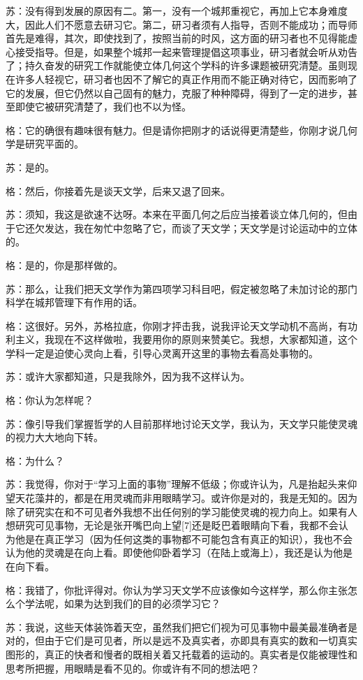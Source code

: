 \documentclass[12pt,oneside]{book}
\begin{document}
苏：没有得到发展的原因有二。第一，没有一个城邦重视它，再加上它本身难度大，因此人们不愿意去研习它。第二，研习者须有人指导，否则不能成功；而导师首先是难得，其次，即使找到了，按照当前的时风，这方面的研习者也不见得能虚心接受指导。但是，如果整个城邦一起来管理提倡这项事业，研习者就会听从劝告了；持久奋发的研究工作就能使立体几何这个学科的许多课题被研究清楚。虽则现在许多人轻视它，研习者也因不了解它的真正作用而不能正确对待它，因而影响了它的发展，但它仍然以自己固有的魅力，克服了种种障碍，得到了一定的进步，甚至即使它被研究清楚了，我们也不以为怪。

格：它的确很有趣味很有魅力。但是请你把刚才的话说得更清楚些，你刚才说几何学是研究平面的。

苏：是的。

格：然后，你接着先是谈天文学，后来又退了回来。

苏：须知，我这是欲速不达呀。本来在平面几何之后应当接着谈立体几何的，但由于它还欠发达，我在匆忙中忽略了它，而谈了天文学；天文学是讨论运动中的立体的。

格：是的，你是那样做的。

苏：那么，让我们把天文学作为第四项学习科目吧，假定被忽略了未加讨论的那门科学在城邦管理下有作用的话。

格：这很好。另外，苏格拉底，你刚才抨击我，说我评论天文学动机不高尚，有功利主义，我现在不这样做啦，我要用你的原则来赞美它。我想，大家都知道，这个学科一定是迫使心灵向上看，引导心灵离开这里的事物去看高处事物的。

苏：或许大家都知道，只是我除外，因为我不这样认为。

格：你认为怎样呢？

苏：像引导我们掌握哲学的人目前那样地讨论天文学，我认为，天文学只能使灵魂的视力大大地向下转。

格：为什么？

苏：我觉得，你对于“学习上面的事物”理解不低级；你或许认为，凡是抬起头来仰望天花藻井的，都是在用灵魂而非用眼睛学习。或许你是对的，我是无知的。因为除了研究实在和不可见者外我想不出任何别的学习能使灵魂的视力向上。如果有人想研究可见事物，无论是张开嘴巴向上望[7]还是眨巴着眼睛向下看，我都不会认为他是在真正学习（因为任何这类的事物都不可能包含有真正的知识），我也不会认为他的灵魂是在向上看。即使他仰卧着学习（在陆上或海上），我还是认为他是在向下看。

格：我错了，你批评得对。你认为学习天文学不应该像如今这样学，那么你主张怎么个学法呢，如果为达到我们的目的必须学习它？

苏：我说，这些天体装饰着天空，虽然我们把它们视为可见事物中最美最准确者是对的，但由于它们是可见者，所以是远不及真实者，亦即具有真实的数和一切真实图形的，真正的快者和慢者的既相关着又托载着的运动的。真实者是仅能被理性和思考所把握，用眼睛是看不见的。你或许有不同的想法吧？
\end{document}
